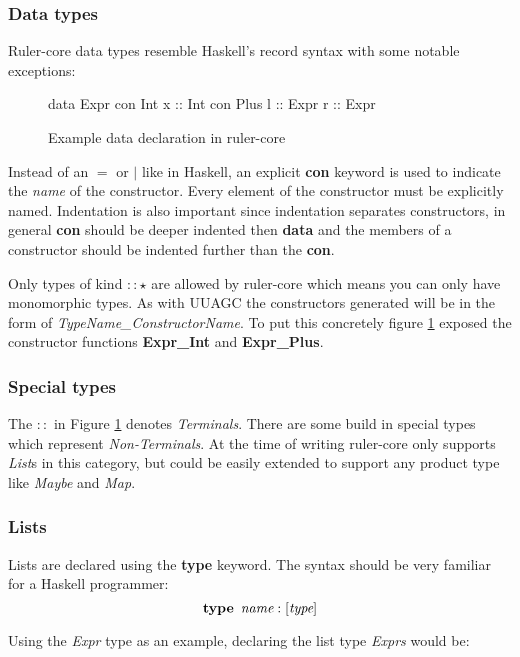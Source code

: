 \subsubsection{Data types}
Ruler-core data types resemble Haskell's record syntax with some notable exceptions:

\begin{figure}[h!]
\begin{code}
data Expr
  con Int
    x :: Int
  con Plus
    l :: Expr
    r :: Expr
\end{code}
\caption{Example data declaration in ruler-core}
\label{data:example}
\end{figure}

Instead of an $=$ or $|$ like in Haskell, an explicit \textbf{con} keyword is used to indicate the \emph{name} of the constructor. Every element of the constructor must be explicitly named. Indentation is also important since indentation separates constructors, in general \textbf{con} should be deeper indented then \textbf{data} and the members of a constructor should be indented further than the \textbf{con}.

Only types of kind $:: \star$ are allowed by ruler-core which means you can only have monomorphic types. As with UUAGC the constructors generated will be in the form of \emph{TypeName\_ConstructorName}. To put this concretely figure \ref{data:example} exposed the constructor functions \textbf{Expr\_Int} and \textbf{Expr\_Plus}.
\subsubsection{Special types}
The $::$ in Figure \ref{data:example} denotes \emph{Terminals}. There are some build in special types which represent \emph{Non-Terminals}. At the time of writing ruler-core only supports \emph{List}s in this category, but could be easily extended to support any product type like \emph{Maybe} and \emph{Map}.

\subsubsection{Lists}
Lists are declared using the \textbf{type} keyword. The syntax should be very familiar for a Haskell programmer: \[ \textbf{type} \hspace{5pt} \emph{name} : [\emph{type}] \]

Using the \emph{Expr} type as an example, declaring the list type \emph{Exprs} would be:

